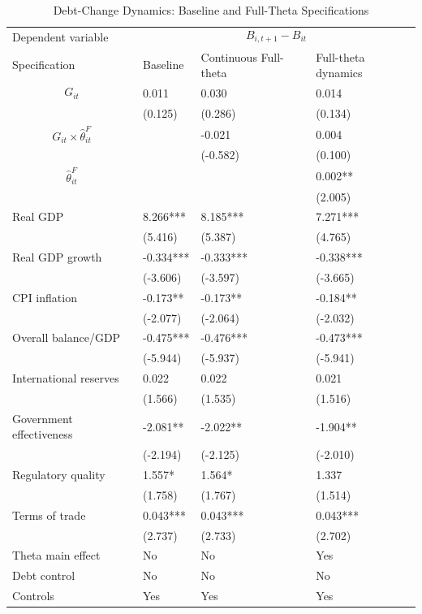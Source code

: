 \begin{table}[H]\centering
\begin{threeparttable}
\caption{Debt-Change Dynamics: Baseline and Full-Theta Specifications}
\label{tab:debt_change_combined_fulltheta}
\scriptsize
\begin{tabularx}{\textwidth}{lYYY}
\toprule
Dependent variable &  \\
\cmidrule(lr){2-4}
Specification & Baseline & Continuous Full-theta & Full-theta dynamics \\
\midrule
$$G_{it}$$ & 0.011 & 0.030 & 0.014 \\
 & (0.125) & (0.286) & (0.134) \\
$$G_{it}\times\widehat{\theta}^{F}_{it}$$ &  & -0.021 & 0.004 \\
 &  & (-0.582) & (0.100) \\
$$\widehat{\theta}^{F}_{it}$$ &  &  & 0.002** \\
 &  &  & (2.005) \\
Real GDP & 8.266*** & 8.185*** & 7.271*** \\
 & (5.416) & (5.387) & (4.765) \\
Real GDP growth & -0.334*** & -0.333*** & -0.338*** \\
 & (-3.606) & (-3.597) & (-3.665) \\
CPI inflation & -0.173** & -0.173** & -0.184** \\
 & (-2.077) & (-2.064) & (-2.032) \\
Overall balance/GDP & -0.475*** & -0.476*** & -0.473*** \\
 & (-5.944) & (-5.937) & (-5.941) \\
International reserves & 0.022 & 0.022 & 0.021 \\
 & (1.566) & (1.535) & (1.516) \\
Government effectiveness & -2.081** & -2.022** & -1.904** \\
 & (-2.194) & (-2.125) & (-2.010) \\
Regulatory quality & 1.557* & 1.564* & 1.337 \\
 & (1.758) & (1.767) & (1.514) \\
Terms of trade & 0.043*** & 0.043*** & 0.043*** \\
 & (2.737) & (2.733) & (2.702) \\
\midrule
Theta main effect & No & No & Yes \\
Debt control & No & No & No \\
Controls & Yes & Yes & Yes \\

\end{tabularx}
\end{threeparttable}
\end{table}
